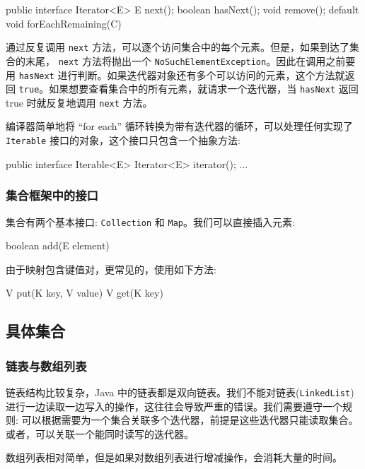 \begin{Java}
public interface Iterator<E> {
    E next();
    boolean hasNext();
    void remove();
    default void forEachRemaining(C)
}
\end{Java}

通过反复调用 \texttt{next} 方法，可以逐个访问集合中的每个元素。但是，如果到达了集合的末尾， \texttt{next} 方法将抛出一个 \texttt{NoSuchElementException}。因此在调用之前要用 \texttt{hasNext} 进行判断。如果迭代器对象还有多个可以访问的元素，这个方法就返回 \texttt{true}。如果想要查看集合中的所有元素，就请求一个迭代器，当 \texttt{hasNext} 返回 true 时就反复地调用 \texttt{next} 方法。

编译器简单地将 ``for each'' 循环转换为带有迭代器的循环，可以处理任何实现了 \texttt{Iterable} 接口的对象，这个接口只包含一个抽象方法:

\begin{Java}
public interface Iterable<E> {
    Iterator<E> iterator();
    ...
}
\end{Java}

\subsubsection{集合框架中的接口}

集合有两个基本接口: \texttt{Collection} 和 \texttt{Map}。我们可以直接插入元素:

\begin{Java}
boolean add(E element)
\end{Java}

由于映射包含键值对，更常见的，使用如下方法:
\begin{Java}
V put(K key, V value)
V get(K key)
\end{Java}

\subsection{具体集合}

\subsubsection{链表与数组列表}

链表结构比较复杂，Java 中的链表都是双向链表。我们不能对链表(\texttt{LinkedList})进行一边读取一边写入的操作，这往往会导致严重的错误。我们需要遵守一个规则: 可以根据需要为一个集合关联多个迭代器，前提是这些迭代器只能读取集合。或者，可以关联一个能同时读写的迭代器。

数组列表相对简单，但是如果对数组列表进行增减操作，会消耗大量的时间。


